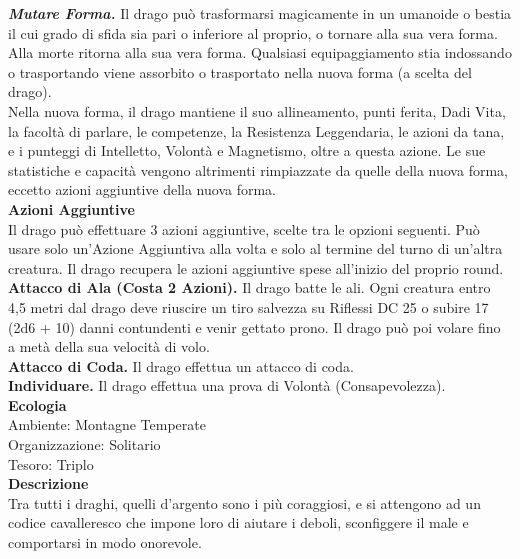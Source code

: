 \begin{multicols}{2}
\emph{\textbf{Mutare Forma.}} Il drago può trasformarsi magicamente in un umanoide o bestia il cui grado di sfida sia pari o inferiore al proprio,  o tornare alla sua vera forma. Alla morte ritorna alla sua vera forma.  Qualsiasi equipaggiamento stia indossando o trasportando viene  assorbito o trasportato nella nuova forma (a scelta del drago).  \\
Nella nuova forma, il drago mantiene il suo allineamento, punti  ferita, Dadi Vita, la facoltà di parlare, le competenze, la Resistenza  Leggendaria, le azioni da tana, e i punteggi di Intelletto, Volontà  e Magnetismo, oltre a questa azione. Le sue statistiche e capacità  vengono altrimenti rimpiazzate da quelle della nuova forma, eccetto azioni aggiuntive della nuova forma.\\
\textbf{Azioni Aggiuntive}\\
Il drago può effettuare 3 azioni aggiuntive, scelte tra le opzioni  seguenti. Può usare solo un'Azione Aggiuntiva alla volta e solo  al termine del turno di un'altra creatura. Il drago recupera le azioni aggiuntive spese all'inizio del proprio round.\\
\textbf{Attacco di Ala (Costa 2 Azioni).} Il drago batte le ali. Ogni creatura entro 4,5 metri dal drago deve riuscire un tiro salvezza su Riflessi DC 25 o subire 17 (2d6 + 10) danni contundenti e  venir gettato prono. Il drago può poi volare fino a metà della sua velocità di volo.\\
\textbf{Attacco di Coda.} Il drago effettua un attacco di coda.\\
\textbf{Individuare.} Il drago effettua una prova di Volontà (Consapevolezza).\\
\textbf{Ecologia}\\
Ambiente: Montagne Temperate\\
Organizzazione: Solitario\\
Tesoro: Triplo\\
\textbf{Descrizione}\\
Tra tutti i draghi, quelli d’argento sono i più coraggiosi, e si attengono ad un codice cavalleresco che impone loro di aiutare i deboli, sconfiggere il male e comportarsi in modo onorevole.\\


\end{multicols}
